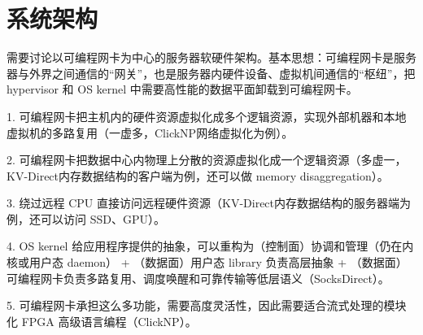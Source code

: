 \chapter{系统架构}

需要讨论以可编程网卡为中心的服务器软硬件架构。基本思想：可编程网卡是服务器与外界之间通信的“网关”，也是服务器内硬件设备、虚拟机间通信的“枢纽”，把 hypervisor 和 OS kernel 中需要高性能的数据平面卸载到可编程网卡。

1. 可编程网卡把主机内的硬件资源虚拟化成多个逻辑资源，实现外部机器和本地虚拟机的多路复用（一虚多，ClickNP网络虚拟化为例）。

2. 可编程网卡把数据中心内物理上分散的资源虚拟化成一个逻辑资源（多虚一，KV-Direct内存数据结构的客户端为例，还可以做 memory disaggregation）。

3. 绕过远程 CPU 直接访问远程硬件资源（KV-Direct内存数据结构的服务器端为例，还可以访问 SSD、GPU）。

4. OS kernel 给应用程序提供的抽象，可以重构为（控制面）协调和管理（仍在内核或用户态 daemon） + （数据面）用户态 library 负责高层抽象 + （数据面）可编程网卡负责多路复用、调度唤醒和可靠传输等低层语义（SocksDirect）。

5. 可编程网卡承担这么多功能，需要高度灵活性，因此需要适合流式处理的模块化 FPGA 高级语言编程（ClickNP）。